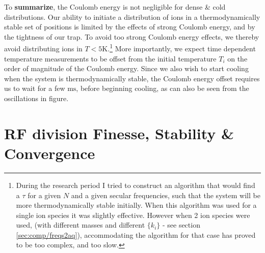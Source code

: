 To \textbf{summarize}, the Coulomb energy is not negligible for dense \& cold distributions. Our ability to initiate a distribution of ions in a thermodynamically stable set of positions is limited by the effects of strong Coulomb energy, and by the tightness of our trap. To avoid too strong Coulomb energy effects, we thereby avoid distributing ions in $T < 5\mathrm{K}$.\footnote{During the research period I tried to construct an algorithm that would find a $\tau$ for a given $N$ and a given secular frequencies, such that the system will be more thermodynamically stable initially. When this algorithm was used for a single ion species it was slightly effective. However when 2 ion species were used, (with different masses and different $\{k_i\}$ - see section \ref{sec:comp/freqs2aq}), accommodating the algorithm for that case has proved to be too complex, and too slow.} More importantly, we expect time dependent temperature measurements to be offset from the initial temperature $T_i$ on the order of magnitude of the Coulomb energy. Since we also wish to start cooling when the system is thermodynamically stable, the Coulomb energy offset requires us to wait for a few $\mathrm{ms}$, before beginning cooling, as can also be seen from the oscillations in figure. %

\section{RF division Finesse, Stability \& Convergence}\label{sec:comp/convergence}

